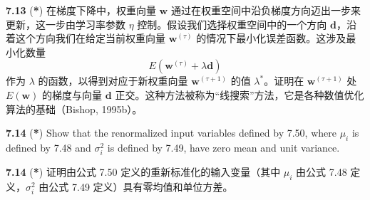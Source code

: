 \documentclass{article}
\begin{document}
\textbf{7.13} (\textbf{*}) 在梯度下降中，权重向量 $\mathbf{w}$ 通过在权重空间中沿负梯度方向迈出一步来更新，这一步由学习率参数 $\eta$ 控制。假设我们选择权重空间中的一个方向 $\mathbf{d}$，沿着这个方向我们在给定当前权重向量 $\mathbf{w}^{(\tau)}$ 的情况下最小化误差函数。这涉及最小化数量
\[
E(\mathbf{w}^{(\tau)} + \lambda \mathbf{d})
\]
作为 $\lambda$ 的函数，以得到对应于新权重向量 $\mathbf{w}^{(\tau+1)}$ 的值 $\lambda^*$。证明在 $\mathbf{w}^{(\tau+1)}$ 处 $E(\mathbf{w})$ 的梯度与向量 $\mathbf{d}$ 正交。这种方法被称为“线搜索”方法，它是各种数值优化算法的基础（Bishop, 1995b）。

\textbf{7.14} (\textbf{*}) Show that the renormalized input variables defined by {7.50}, where $\mu_i$ is defined by {7.48} and $\sigma_i^2$ is defined by {7.49}, have zero mean and unit variance.

\textbf{7.14} (\textbf{*}) 证明由公式 {7.50} 定义的重新标准化的输入变量（其中 $\mu_i$ 由公式 {7.48} 定义，$\sigma_i^2$ 由公式 {7.49} 定义）具有零均值和单位方差。
\end{document}
